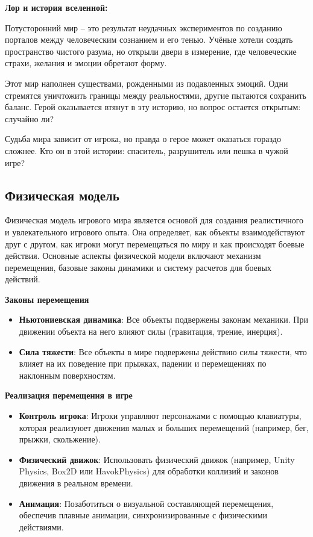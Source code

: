 \documentclass{article}
\begin{document}
	\newpage
	\textbf{Лор и история вселенной:}
	
	Потусторонний мир – это результат неудачных экспериментов по созданию порталов между человеческим сознанием и его тенью. Учёные хотели создать пространство чистого разума, но открыли двери в измерение, где человеческие страхи, желания и эмоции обретают форму.
	
	Этот мир наполнен существами, рожденными из подавленных эмоций. Одни стремятся уничтожить границы между реальностями, другие пытаются сохранить баланс. Герой оказывается втянут в эту историю, но вопрос остается открытым: случайно ли?
	
	Судьба мира зависит от игрока, но правда о герое может оказаться гораздо сложнее. Кто он в этой истории: спаситель, разрушитель или пешка в чужой игре?
	
	\subsection{Физическая модель}
	
	
	Физическая модель игрового мира является основой для создания реалистичного и увлекательного игрового опыта. Она определяет, как объекты взаимодействуют друг с другом, как игроки могут перемещаться по миру и как происходят боевые действия. Основные аспекты физической модели включают механизм перемещения, базовые законы динамики и систему расчетов для боевых действий.
	
	\textbf{Законы перемещения}
	
	\begin{itemize}
		\item \textbf{Ньютониевская динамика}: Все объекты подвержены законам механики. При движении объекта на него влияют силы (гравитация, трение, инерция).
		\item \textbf{Сила тяжести}: Все объекты в мире подвержены действию силы тяжести, что влияет на их поведение при прыжках, падении и перемещениях по наклонным поверхностям.
	\end{itemize}
	
	\textbf{Реализация перемещения в игре}
	\begin{itemize}
		\item \textbf{Контроль игрока}: Игроки управляют персонажами с помощью клавиатуры, которая реализуюет движения малых и больших перемещений (например, бег, прыжки, скольжение).
		\item \textbf{Физический движок}: Использовать физический движок (например, Unity Physics, Box2D или HavokPhysics) для обработки коллизий и законов движения в реальном времени.
		\item \textbf{Анимация}: Позаботиться о визуальной составляющей перемещения, обеспечив плавные анимации, синхронизированные с физическими действиями.
	\end{itemize}
	
\end{document}
